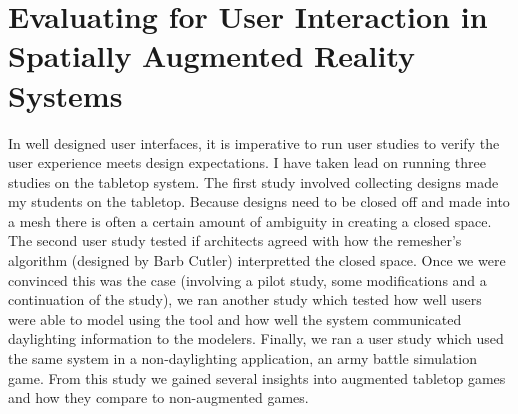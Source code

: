 


\chapter{Evaluating for User Interaction in Spatially Augmented Reality Systems}


In well designed user interfaces, it is imperative to run user studies to verify the user experience meets design expectations.  I have taken lead on running three studies on the tabletop system.  The first study involved collecting designs made my students on the tabletop.  Because designs need to be closed off and made into a mesh there is often a certain amount of ambiguity in creating a closed space.  The second user study tested if architects agreed with how the remesher’s algorithm (designed by Barb Cutler) interpretted the closed space.  Once we were convinced this was the case (involving a pilot study, some modifications and a continuation of the study), we ran another study which tested how well users were able to model using the tool and how well the system communicated daylighting information to the modelers.  Finally, we ran a user study which used the same system in a non-daylighting application, an  army battle simulation game.  From this study we gained several insights into augmented tabletop games and how they compare to non-augmented games.
%
%
%



